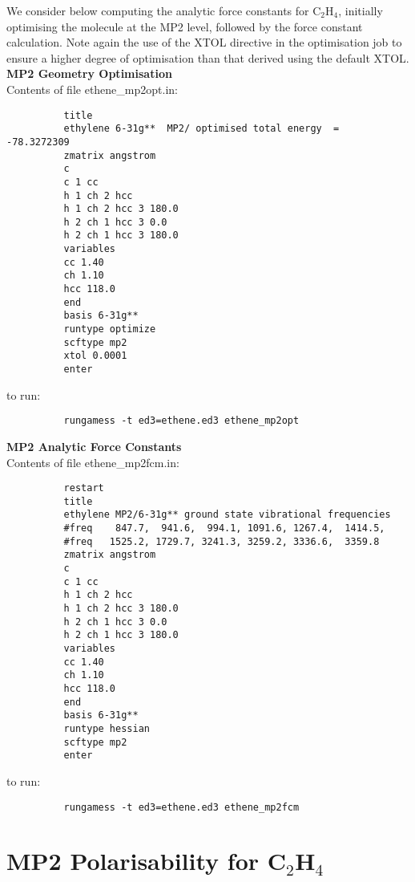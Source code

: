 \documentclass[11pt,fleqn]{article}
\newcommand{\ethene}{\mbox{C$_{2}$H$_{4}$}}
\begin{document}
We consider below computing the analytic force constants for
\ethene, initially optimising the molecule at the MP2 level, followed
by the force constant calculation. Note again the use of the XTOL
directive in the optimisation job to ensure a higher degree
of optimisation than that derived using the default XTOL.\\

{\bf MP2 Geometry Optimisation}\\

Contents of file ethene\_mp2opt.in:
{
\footnotesize
\begin{verbatim}
          title 
          ethylene 6-31g**  MP2/ optimised total energy  =  -78.3272309
          zmatrix angstrom
          c
          c 1 cc
          h 1 ch 2 hcc
          h 1 ch 2 hcc 3 180.0
          h 2 ch 1 hcc 3 0.0
          h 2 ch 1 hcc 3 180.0
          variables
          cc 1.40
          ch 1.10
          hcc 118.0
          end
          basis 6-31g**
          runtype optimize
          scftype mp2
          xtol 0.0001
          enter
\end{verbatim}
}
to run:
{
\footnotesize
\begin{verbatim}
          rungamess -t ed3=ethene.ed3 ethene_mp2opt
\end{verbatim}
}

{\bf MP2 Analytic Force Constants}\\

Contents of file ethene\_mp2fcm.in:
{
\footnotesize
\begin{verbatim}
          restart
          title 
          ethylene MP2/6-31g** ground state vibrational frequencies
          #freq    847.7,  941.6,  994.1, 1091.6, 1267.4,  1414.5,  
          #freq   1525.2, 1729.7, 3241.3, 3259.2, 3336.6,  3359.8
          zmatrix angstrom
          c
          c 1 cc
          h 1 ch 2 hcc
          h 1 ch 2 hcc 3 180.0
          h 2 ch 1 hcc 3 0.0
          h 2 ch 1 hcc 3 180.0
          variables
          cc 1.40
          ch 1.10
          hcc 118.0
          end
          basis 6-31g**
          runtype hessian
          scftype mp2
          enter
\end{verbatim}
}
to run:
{
\footnotesize
\begin{verbatim}
          rungamess -t ed3=ethene.ed3 ethene_mp2fcm
\end{verbatim}
}

\section[MP2 Polarisability for \ethene]{MP2 Polarisability for \ethene}
\end{document}
